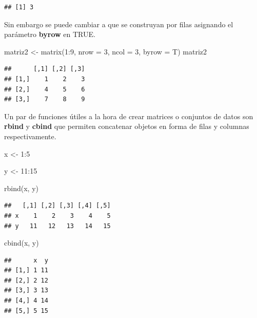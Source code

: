 \documentclass[
  12pt,
]{book}
\newenvironment{Shaded}{\begin{snugshade}}{\end{snugshade}}
\newcommand{\AttributeTok}[1]{\textcolor[rgb]{0.77,0.63,0.00}{#1}}
\newcommand{\DecValTok}[1]{\textcolor[rgb]{0.00,0.00,0.81}{#1}}
\newcommand{\FunctionTok}[1]{\textcolor[rgb]{0.00,0.00,0.00}{#1}}
\newcommand{\NormalTok}[1]{#1}
\newcommand{\OtherTok}[1]{\textcolor[rgb]{0.56,0.35,0.01}{#1}}
\newcommand{\SpecialCharTok}[1]{\textcolor[rgb]{0.00,0.00,0.00}{#1}}
\begin{document}
\begin{verbatim}
## [1] 3
\end{verbatim}

Sin embargo se puede cambiar a que se construyan por filas asignando el parámetro \textbf{byrow} en TRUE.

\begin{Shaded}
\begin{Highlighting}[]
\NormalTok{matriz2 }\OtherTok{\textless{}{-}} \FunctionTok{matrix}\NormalTok{(}\DecValTok{1}\SpecialCharTok{:}\DecValTok{9}\NormalTok{, }\AttributeTok{nrow =} \DecValTok{3}\NormalTok{, }\AttributeTok{ncol =} \DecValTok{3}\NormalTok{, }\AttributeTok{byrow =}\NormalTok{ T)}
\NormalTok{matriz2}
\end{Highlighting}
\end{Shaded}

\begin{verbatim}
##      [,1] [,2] [,3]
## [1,]    1    2    3
## [2,]    4    5    6
## [3,]    7    8    9
\end{verbatim}

Un par de funciones útiles a la hora de crear matrices o conjuntos de datos son \textbf{rbind} y \textbf{cbind} que permiten concatenar objetos en forma de filas y columnas respectivamente.

\begin{Shaded}
\begin{Highlighting}[]
\NormalTok{x }\OtherTok{\textless{}{-}} \DecValTok{1}\SpecialCharTok{:}\DecValTok{5}

\NormalTok{y }\OtherTok{\textless{}{-}} \DecValTok{11}\SpecialCharTok{:}\DecValTok{15}

\FunctionTok{rbind}\NormalTok{(x, y)}
\end{Highlighting}
\end{Shaded}

\begin{verbatim}
##   [,1] [,2] [,3] [,4] [,5]
## x    1    2    3    4    5
## y   11   12   13   14   15
\end{verbatim}

\begin{Shaded}
\begin{Highlighting}[]
\FunctionTok{cbind}\NormalTok{(x, y)}
\end{Highlighting}
\end{Shaded}

\begin{verbatim}
##      x  y
## [1,] 1 11
## [2,] 2 12
## [3,] 3 13
## [4,] 4 14
## [5,] 5 15
\end{verbatim}
\end{document}
